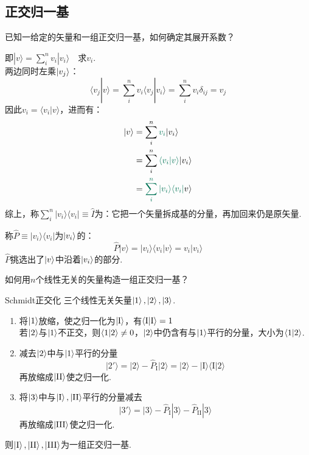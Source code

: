 \subsection{正交归一基}
\begin{question}
    已知一给定的矢量和一组正交归一基，如何确定其展开系数？
\end{question}
\begin{solution}
    即$|v\rangle = \sum_{i}^n v_i |v_i\rangle \quad \text{求} v_i$. \\
    两边同时左乘$\ket{v_j}$：
    \[\langle v_j | v \rangle = \sum_{i}^n v_i \langle v_j | v_i \rangle = \sum_{i}^n v_i \delta_{ij} = v_j\]
    因此$v_i = \langle v_i | v \rangle$，进而有：
    \begin{align*}
        |v\rangle &= \sum_{i}^n \textcolor{GreenDeep}{v_i} |v_i\rangle \\
        &= \sum_{i}^n \textcolor{GreenDeep}{\langle v_i | v \rangle} |v_i\rangle \\
        &= \textcolor{GreenDeep}{\sum_{i}^n |v_i\rangle \langle v_i |} v \rangle
    \end{align*}
    综上，称$\sum_{i}^n |v_i\rangle \langle v_i | \equiv \hat{I}$为：它把一个矢量拆成基的分量，再加回来仍是原矢量.

    称$\hat{P} \equiv |v_i\rangle \langle v_i |$为$\ket{v_i}$的：
    \[\hat{P} |v\rangle = |v_i\rangle \langle v_i | v \rangle = v_i |v_i\rangle\]
    $\hat{P}$挑选出了$\ket{v}$中沿着$\ket{v_i}$的部分.
\end{solution}
\begin{question}
    如何用$n$个线性无关的矢量构造一组正交归一基？
\end{question}
\begin{extension}{Schmidt正交化}
    三个线性无关矢量$\ket{1},\ket{2},\ket{3}$.
    \begin{enumerate}
        \item 将$\ket{1}$放缩，使之归一化为$\ket{\text{I}}$，有$\braket{\text{I}}{\text{I}}=1$\\
        若$\ket{2}$与$\ket{1}$不正交，则$\braket{1}{2}\neq 0$，$\ket{2}$中仍含有与$\ket{1}$平行的分量，大小为$\braket{1}{2}$.
        \item 减去$\ket{2}$中与$\ket{1}$平行的分量
        $$|2'\rangle = |2\rangle - \hat{P}_{\text{I}} |2\rangle = |2\rangle - |\text{I}\rangle \langle \text{I} | 2 \rangle$$
        再放缩成$\ket{\text{II}}$使之归一化.
        \item 将$\ket{3}$中与$\ket{\text{I}},\ket{\text{II}}$平行的分量减去
        $$|3'\rangle = |3\rangle - \hat{P}_{\text{I}} |3\rangle - \hat{P}_{\text{II}} |3\rangle$$
        再放缩成$\ket{\text{III}}$使之归一化.
    \end{enumerate}
    则$\ket{\text{I}},\ket{\text{II}},\ket{\text{III}}$为一组正交归一基.
\end{extension}

